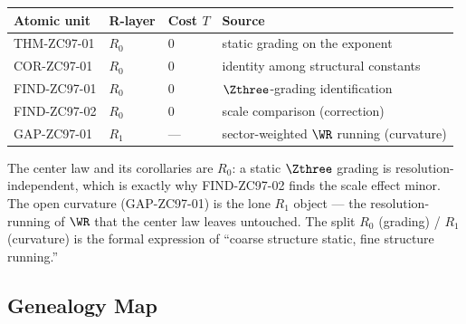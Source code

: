 \documentclass[12pt, a4paper]{article}
\begin{document}
\begin{layerbox}[title={R-Layer Assignments for ZC97}]
{\small\renewcommand{\arraystretch}{1.25}
\begin{center}
\begin{tabular}{@{}llll@{}}
\toprule
Atomic unit & R-layer & Cost $T$ & Source \\
\midrule
THM-ZC97-01  & $R_0$ & $0$ & static grading on the exponent \\
COR-ZC97-01  & $R_0$ & $0$ & identity among structural constants \\
FIND-ZC97-01 & $R_0$ & $0$ & $\Zthree$-grading identification \\
FIND-ZC97-02 & $R_0$ & $0$ & scale comparison (correction) \\
GAP-ZC97-01  & $R_1$ & --- & sector-weighted $\WR$ running (curvature) \\
\bottomrule
\end{tabular}
\end{center}}
The center law and its corollaries are $R_0$: a static $\Zthree$ grading is
resolution-independent, which is exactly why FIND-ZC97-02 finds the scale effect
minor. The open curvature (GAP-ZC97-01) is the lone $R_1$ object --- the
resolution-running of $\WR$ that the center law leaves untouched. The split
$R_0$ (grading) / $R_1$ (curvature) is the formal expression of ``coarse
structure static, fine structure running.''
\end{layerbox}

\subsection{Genealogy Map}
\label{sec:genealogy-zc97}
\end{document}
